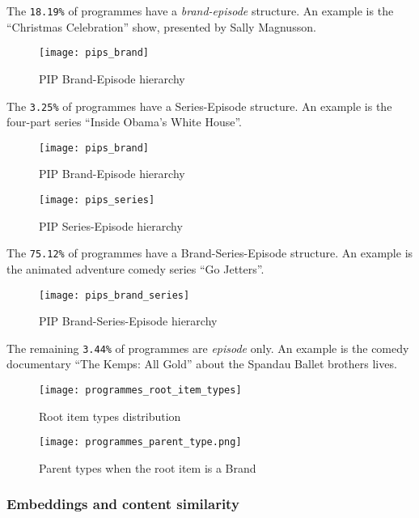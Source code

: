 The \verb|18.19%| of programmes have a \textit{brand-episode} structure.
An example is the ``Christmas Celebration'' show, presented by Sally Magnusson.

\begin{figure}[H]
  \centering
  \texttt{[image: pips\_brand]}
  \caption{PIP Brand-Episode hierarchy}
  \label{fig:pips_brand}
\end{figure}

The \verb|3.25%| of programmes have a Series-Episode structure.
An example is the four-part series ``Inside Obama's White House''.

\begin{figure}[H]
  \centering
  \texttt{[image: pips\_brand]}
  \caption{PIP Brand-Episode hierarchy}
  \label{fig:pips_brand}
\end{figure}

\begin{figure}[H]
  \centering
  \texttt{[image: pips\_series]}
  \caption{PIP Series-Episode hierarchy}
  \label{fig:pips_series}
\end{figure}

The \verb|75.12%| of programmes have a Brand-Series-Episode structure.
An example is the animated adventure comedy series ``Go Jetters''.

\begin{figure}[H]
  \centering
  \texttt{[image: pips\_brand\_series]}
  \caption{PIP Brand-Series-Episode hierarchy}
  \label{fig:pips_brand_series}
\end{figure}

The remaining \verb|3.44%| of programmes are \textit{episode} only.
An example is the comedy documentary ``The Kemps: All Gold'' about the Spandau Ballet brothers lives.

\begin{figure}[H]
  \centering
  \texttt{[image: programmes\_root\_item\_types]}
  \caption{Root item types distribution}
  \label{fig:programmes_root_item_types}
\end{figure}

\begin{figure}[H]
  \centering
  \texttt{[image: programmes\_parent\_type.png]}
  \caption{Parent types when the root item is a Brand}
  \label{fig:programmes_parent_type}
\end{figure}

\subsubsection{Embeddings and content similarity}

